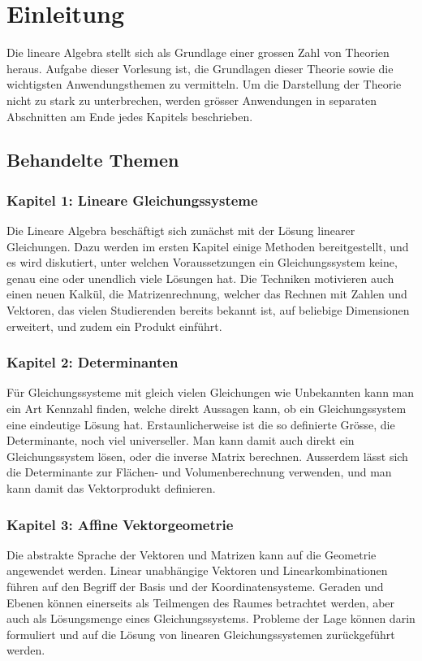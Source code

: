 %
%
%
\chapter*{Einleitung}

Die lineare Algebra stellt sich als Grundlage einer grossen
Zahl von Theorien heraus.
Aufgabe dieser Vorlesung ist, die
Grundlagen dieser Theorie sowie die wichtigsten Anwendungsthemen
zu vermitteln.
Um die Darstellung der Theorie nicht zu stark zu unterbrechen,
werden grösser Anwendungen in separaten Abschnitten am Ende
jedes Kapitels beschrieben.

\section*{Behandelte Themen}
\subsection*{Kapitel 1: Lineare Gleichungssysteme}
Die Lineare Algebra beschäftigt sich zunächst mit der Lösung linearer
Gleichungen.
Dazu werden im ersten Kapitel einige Methoden bereitgestellt,
und es wird diskutiert, unter welchen Voraussetzungen ein
Gleichungssystem keine, genau eine oder unendlich viele
Lösungen hat.
Die Techniken motivieren auch einen neuen Kalkül, die Matrizenrechnung,
welcher das Rechnen mit Zahlen und Vektoren, das vielen
Studierenden bereits bekannt ist, auf beliebige Dimensionen erweitert,
und zudem ein Produkt einführt.

\subsection*{Kapitel 2: Determinanten}
Für Gleichungssysteme mit gleich vielen Gleichungen wie Unbekannten
kann man ein Art Kennzahl finden, welche direkt Aussagen kann,
ob ein Gleichungssystem eine eindeutige Lösung hat.
Erstaunlicherweise ist die so definierte Grösse, die Determinante,
noch viel universeller.
Man kann damit auch direkt ein Gleichungssystem lösen, oder
die inverse Matrix berechnen.
Ausserdem lässt sich die Determinante zur Flächen- und Volumenberechnung
verwenden, und man kann damit das Vektorprodukt definieren.

\subsection*{Kapitel 3: Affine Vektorgeometrie}
Die abstrakte Sprache der Vektoren und Matrizen kann auf die Geometrie
angewendet werden.
Linear unabhängige Vektoren und Linearkombinationen führen auf den
Begriff der Basis und der Koordinatensysteme.
Geraden und Ebenen können einerseits als Teilmengen des Raumes
betrachtet werden, aber auch als Lösungsmenge eines Gleichungssystems.
Probleme der Lage können darin formuliert und auf die Lösung von
linearen Gleichungssystemen zurückgeführt werden.

